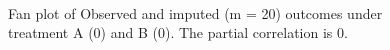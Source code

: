 \begin{figure}[ht!]
\begin{center}
{{				}
			}\\
		\end{center}
		\caption{Fan plot of Observed and imputed (m = 20) outcomes under treatment A (0) and B (0). The partial correlation is 0.}
		\label{fig4_6}
	\end{figure}
	
